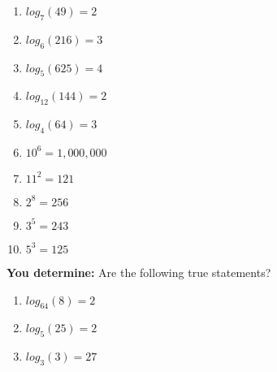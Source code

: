 \documentclass[12pt]{article}
\begin{document}
\begin{multicols}{2}
\begin{enumerate}
	\setlength\itemsep{1cm}

	\item $log_{7}(49)=2$\\	
		
	\item $log_{6}(216)=3$\\
	
	\item $log_{5}(625)=4$\\
		
	\item $log_{12}(144)=2$\\
	
	\item $log_{4}(64)=3$\\
	
	\item $10^6=1,000,000$\\
	
	\item $11^2=121$\\
	
	\item $2^8=256$\\
	
	\item $3^5=243$\\
	
	\item $5^3=125$\\
\end{enumerate}
\end{multicols}


\textbf{You determine:} Are the following true statements?\\

\begin{enumerate}[resume]
	\setlength\itemsep{2cm}
	
	\item $log_{64}(8)=2$\\
	
	\item $log_{5}(25)=2$\\
	
	\item $log_{3}(3)=27$\\

\end{enumerate}

\pagebreak
\end{document}
